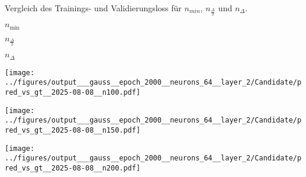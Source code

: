 \begin{otherlanguage}{ngerman}
\begin{samepage}
\begin{minipage}{\textwidth}
\caption{Vergleich des Trainings- und Validierungsloss für $n_{min}$, $n_{\frac{\Delta}{2}}$ und $n_{\Delta}$.}
\label{fig:matrix_plot}

\begin{minipage}{0.05\textwidth}\vspace{0.5cm}\end{minipage}%
\begin{minipage}{0.3\textwidth}\centering \textbf{$n_{\mathrm{min}}$}\end{minipage}%
\begin{minipage}{0.3\textwidth}\centering \textbf{$n_{\frac{\Delta}{2}}$}\end{minipage}%
\begin{minipage}{0.3\textwidth}\centering \textbf{$n_{\Delta}$}\end{minipage}

\vspace{0.125cm}

\begin{minipage}{0.05\textwidth}
    \centering{}
\end{minipage}%
\begin{minipage}{0.3\textwidth}
    \centering
    \texttt{[image: ../figures/output\_\_\_gauss\_\_epoch\_2000\_\_neurons\_64\_\_layer\_2/Candidate/pred\_vs\_gt\_\_2025-08-08\_\_n100.pdf]}
\end{minipage}%
\begin{minipage}{0.3\textwidth}
    \centering
    \texttt{[image: ../figures/output\_\_\_gauss\_\_epoch\_2000\_\_neurons\_64\_\_layer\_2/Candidate/pred\_vs\_gt\_\_2025-08-08\_\_n150.pdf]}
\end{minipage}%
\begin{minipage}{0.3\textwidth}
    \centering
    \texttt{[image: ../figures/output\_\_\_gauss\_\_epoch\_2000\_\_neurons\_64\_\_layer\_2/Candidate/pred\_vs\_gt\_\_2025-08-08\_\_n200.pdf]}
\end{minipage}

\label{fig:pred_vs_gt_matrix}

\end{minipage}
\end{samepage}


\clearpage





\end{otherlanguage}
